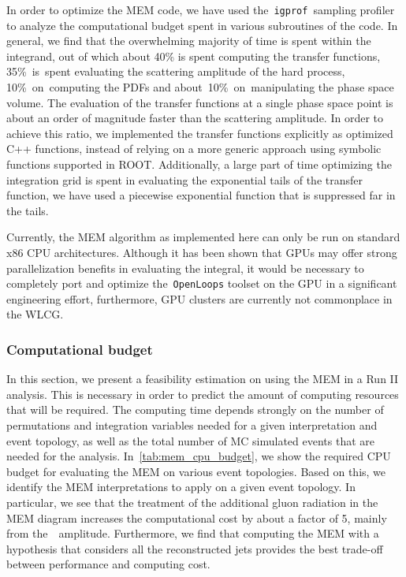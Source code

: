 In order to optimize the MEM code, we have used the~\texttt{igprof}~sampling profiler~\cite{Tuura:2008zza} to analyze the computational budget spent in various subroutines of the code. In general, we find    
that the overwhelming majority of time is spent within the integrand, out of which about 40\% is spent computing the transfer functions, 35\%~is~spent evaluating the scattering amplitude of the hard process, 10\%~on~computing the PDFs and about~10\%~on~manipulating the phase space volume. The evaluation of the transfer functions at a single phase space point is about an order of magnitude faster than the scattering amplitude. In order to achieve this ratio, we implemented the transfer functions explicitly as optimized C++ functions, instead of relying on a more generic approach using symbolic functions supported in ROOT. Additionally, a large part of time optimizing the integration grid is spent in evaluating the exponential tails of the transfer function, we have used a piecewise exponential function that is suppressed far in the tails.

Currently, the MEM algorithm as implemented here can only be run on standard x86 CPU architectures. Although it has been shown that GPUs may offer strong parallelization benefits in evaluating the integral, it would be necessary to completely port and optimize the~\texttt{OpenLoops} toolset on the GPU in a significant engineering effort\cite{Schouten:2014yza}, furthermore, GPU clusters are currently not commonplace in the WLCG.

\subsubsection{Computational budget}
\label{sec:mem_computational}
In this section, we present a feasibility estimation on using the MEM in a Run II analysis. This is necessary in order to predict the amount of computing resources that will be required. The computing time depends strongly on the number of permutations and integration variables needed for a given interpretation and event topology, as well as the total number of MC simulated events that are needed for the analysis. In~\cref{tab:mem_cpu_budget}, we show the required CPU budget for evaluating the MEM on various event topologies. Based on this, we identify the MEM interpretations to apply on a given event topology. In particular, we see that the treatment of the additional gluon radiation in the MEM diagram increases the computational cost by about a factor of 5, mainly from the~\ttbb~amplitude. Furthermore, we find that computing the MEM with a hypothesis that considers all the reconstructed jets provides the best trade-off between performance and computing cost.

